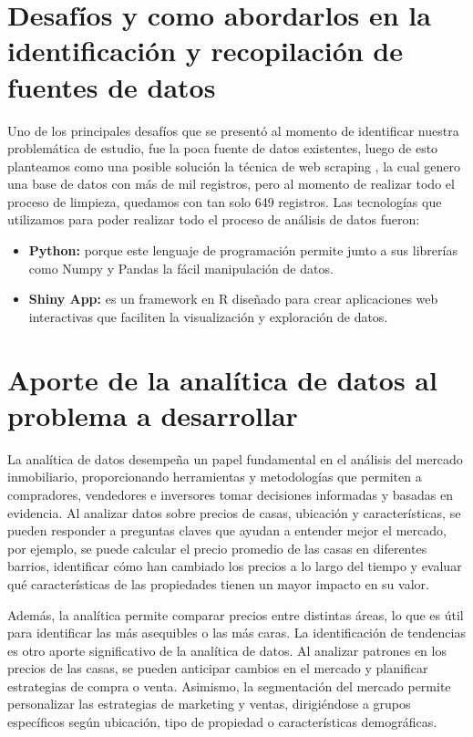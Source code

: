 \documentclass[12pt,a4paper]{article}
\begin{document}
\section{Desafíos y como abordarlos en la identificación y recopilación de fuentes de datos}

Uno de los principales desafíos que se presentó al momento de identificar nuestra problemática de estudio, fue la poca fuente de datos existentes, luego de esto planteamos como una posible solución la técnica de web scraping , la cual genero una base de datos con más de mil registros, pero al momento de realizar todo el proceso de limpieza, quedamos con tan solo 649 registros. 
Las tecnologías que utilizamos para poder realizar todo el proceso de análisis de datos fueron:
\begin{itemize}
	\item [] \textbf{Python:} porque este lenguaje de programación permite junto a sus librerías como  Numpy y Pandas la fácil manipulación de datos.
	\item [] \textbf{Shiny App:} es un framework en R diseñado para crear aplicaciones web interactivas que faciliten la visualización y exploración de datos.
\end{itemize} 

\section{Aporte de la analítica de datos al problema a desarrollar}
La analítica de datos desempeña un papel fundamental en el análisis del mercado inmobiliario, proporcionando herramientas y metodologías que permiten a compradores, vendedores e inversores tomar decisiones informadas y basadas en evidencia. Al analizar datos sobre precios de casas, ubicación y características, se pueden responder a preguntas claves que ayudan a entender mejor el mercado, por ejemplo, se puede calcular el precio promedio de las casas en diferentes barrios, identificar cómo han cambiado los precios a lo largo del tiempo y evaluar qué características de las propiedades tienen un mayor impacto en su valor.

Además, la analítica permite comparar precios entre distintas áreas, lo que es útil para identificar las más asequibles o las más caras. La identificación de tendencias es otro aporte significativo de la analítica de datos. Al analizar patrones en los precios de las casas, se pueden anticipar cambios en el mercado y planificar estrategias de compra o venta. Asimismo, la segmentación del mercado permite personalizar las estrategias de marketing y ventas, dirigiéndose a grupos específicos según ubicación, tipo de propiedad o características demográficas.
\end{document}
